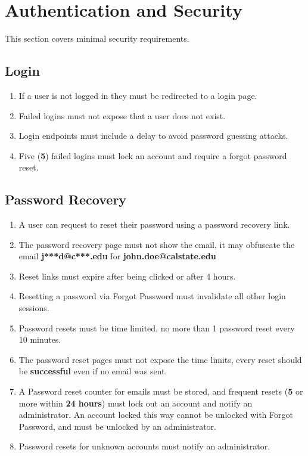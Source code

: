 \section{Authentication and Security}
This section covers minimal security requirements.
	\subsection{Login}
		\begin{enumerate}[leftmargin=3\parindent]
			\item If a user is not logged in they must be redirected to a login page.
			\item Failed logins must not expose that a user does not exist.
			\item Login endpoints must include a delay to avoid password guessing attacks.
			\item Five (\textbf{5}) failed logins must lock an account and require a forgot password reset.
		\end{enumerate}
	\subsection{Password Recovery}
		\begin{enumerate}[leftmargin=3\parindent]
			\item A user can request to reset their password using a password recovery link.
			\item The password recovery page must not show the email, it may obfuscate the email \textbf{j***d@c***.edu} for \textbf{john.doe@calstate.edu}
			\item Reset links must expire after being clicked or after 4 hours.
			\item Resetting a password via Forgot Password must invalidate all other login sessions.
			\item Password resets must be time limited, no more than 1 password reset every 10 minutes.
			\item The password reset pages must not expose the time limits, every reset should be \textbf{successful} even if no email was sent.
			\item A Password reset counter for emails must be stored, and frequent resets (\textbf{5} or more within \textbf{24 hours}) must lock out an account and notify an administrator. An account locked this way cannot be unlocked with Forgot Password, and must be unlocked by an administrator.
			\item Password resets for unknown accounts must notify an administrator.
		\end{enumerate}

